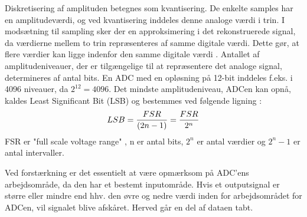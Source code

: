 Diskretisering af amplituden betegnes som kvantisering. De enkelte samples har en amplitudeværdi, og ved kvantisering inddeles denne analoge værdi i trin. I modsætning til sampling sker der en approksimering i det rekonstruerede signal, da værdierne mellem to trin repræsenteres af samme digitale værdi. Dette gør, at flere værdier kan ligge indenfor den samme digitale værdi \cite{Zouridakis2003}. Antallet af amplitudeniveauer, der er tilgængelige til at repræsentere det analoge signal, determineres af antal bits. En ADC med en opløsning på 12-bit inddeles f.eks. i 4096 niveauer, da $2^{12}=4096$. \cite{Konrad2006} Det mindste amplitudeniveau, ADCen kan opnå, kaldes Least Significant Bit (LSB) og bestemmes ved følgende ligning :
\begin{equation}\label{ligningLSB}\centering
LSB = \frac{FSR}{(2n-1)} = \frac{FSR}{2^{n}}
\end{equation}
FSR er "full scale voltage range" , n er antal bits, $2^n$ er antal værdier og $2^{n}-1$ er antal intervaller. 

Ved forstærkning er det essentielt at være opmærksom på ADC'ens arbejdsområde, da den har et bestemt inputområde. Hvis et outputsignal er større eller mindre end hhv. den øvre og nedre værdi inden for arbejdsområdet for ADCen, vil signalet blive afskåret. Herved går en del af dataen tabt.  